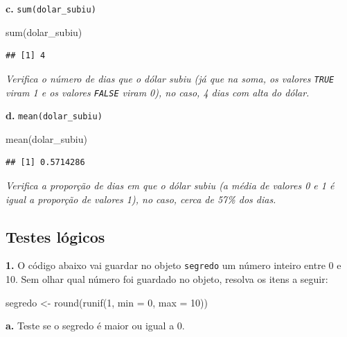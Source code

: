 \documentclass[
]{book}
\newenvironment{Shaded}{\begin{snugshade}}{\end{snugshade}}
\newcommand{\AttributeTok}[1]{\textcolor[rgb]{0.77,0.63,0.00}{#1}}
\newcommand{\DecValTok}[1]{\textcolor[rgb]{0.00,0.00,0.81}{#1}}
\newcommand{\FunctionTok}[1]{\textcolor[rgb]{0.00,0.00,0.00}{#1}}
\newcommand{\NormalTok}[1]{#1}
\newcommand{\OtherTok}[1]{\textcolor[rgb]{0.56,0.35,0.01}{#1}}
\begin{document}
\textbf{c.} \texttt{sum(dolar\_subiu)}

\begin{Shaded}
\begin{Highlighting}[]
\FunctionTok{sum}\NormalTok{(dolar\_subiu)}
\end{Highlighting}
\end{Shaded}

\begin{verbatim}
## [1] 4
\end{verbatim}

\emph{Verifica o número de dias que o dólar subiu (já que na soma, os valores \texttt{TRUE} viram 1 e os valores \texttt{FALSE} viram 0), no caso, 4 dias com alta do dólar.}

\textbf{d.} \texttt{mean(dolar\_subiu)}

\begin{Shaded}
\begin{Highlighting}[]
\FunctionTok{mean}\NormalTok{(dolar\_subiu)}
\end{Highlighting}
\end{Shaded}

\begin{verbatim}
## [1] 0.5714286
\end{verbatim}

\emph{Verifica a proporção de dias em que o dólar subiu (a média de valores 0 e 1 é igual a proporção de valores 1), no caso, cerca de 57\% dos dias.}

\hypertarget{testes-luxf3gicos-1}{%
\subsection*{Testes lógicos}\label{testes-luxf3gicos-1}}

\textbf{1.} O código abaixo vai guardar no objeto \texttt{segredo} um número inteiro entre 0 e 10. Sem olhar qual número foi guardado no objeto, resolva os itens a seguir:

\begin{Shaded}
\begin{Highlighting}[]
\NormalTok{segredo }\OtherTok{\textless{}{-}} \FunctionTok{round}\NormalTok{(}\FunctionTok{runif}\NormalTok{(}\DecValTok{1}\NormalTok{, }\AttributeTok{min =} \DecValTok{0}\NormalTok{, }\AttributeTok{max =} \DecValTok{10}\NormalTok{))}
\end{Highlighting}
\end{Shaded}

\textbf{a.} Teste se o segredo é maior ou igual a 0.
\end{document}
